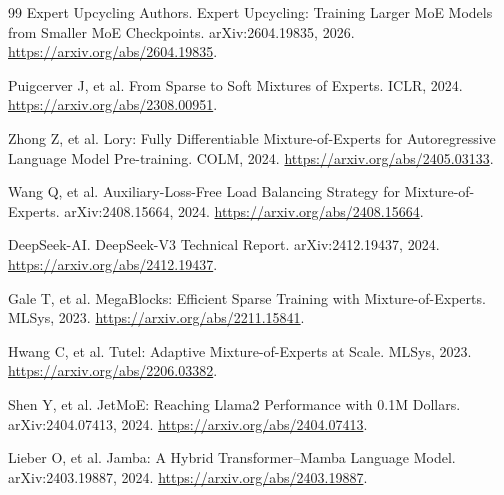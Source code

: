 \documentclass[10pt,a4paper,fontset=none]{ctexart}
\renewcommand{\abstractname}{Abstract}
\renewcommand{\contentsname}{Contents}
\renewcommand{\figurename}{Figure}
\renewcommand{\tablename}{Table}
\renewcommand{\refname}{References}
\renewcommand{\appendixname}{Appendix}
\def\BilingualTocExtension{entoc}
\newcommand{\BilingualUseChineseToc}{\gdef\BilingualTocExtension{zhtoc}}
\begin{document}
\begin{thebibliography}{99}
Expert Upcycling Authors. Expert Upcycling: Training Larger MoE Models from Smaller MoE Checkpoints. arXiv:2604.19835, 2026. \url{https://arxiv.org/abs/2604.19835}.

Puigcerver J, et al. From Sparse to Soft Mixtures of Experts. ICLR, 2024. \url{https://arxiv.org/abs/2308.00951}.

Zhong Z, et al. Lory: Fully Differentiable Mixture-of-Experts for Autoregressive Language Model Pre-training. COLM, 2024. \url{https://arxiv.org/abs/2405.03133}.

Wang Q, et al. Auxiliary-Loss-Free Load Balancing Strategy for Mixture-of-Experts. arXiv:2408.15664, 2024. \url{https://arxiv.org/abs/2408.15664}.

DeepSeek-AI. DeepSeek-V3 Technical Report. arXiv:2412.19437, 2024. \url{https://arxiv.org/abs/2412.19437}.

Gale T, et al. MegaBlocks: Efficient Sparse Training with Mixture-of-Experts. MLSys, 2023. \url{https://arxiv.org/abs/2211.15841}.

Hwang C, et al. Tutel: Adaptive Mixture-of-Experts at Scale. MLSys, 2023. \url{https://arxiv.org/abs/2206.03382}.

Shen Y, et al. JetMoE: Reaching Llama2 Performance with 0.1M Dollars. arXiv:2404.07413, 2024. \url{https://arxiv.org/abs/2404.07413}.

Lieber O, et al. Jamba: A Hybrid Transformer--Mamba Language Model. arXiv:2403.19887, 2024. \url{https://arxiv.org/abs/2403.19887}.

\end{thebibliography}
\clearpage
{}
\setcounter{section}{0}
\setcounter{subsection}{0}
\setcounter{subsubsection}{0}
\setcounter{equation}{0}
\setcounter{figure}{0}
\setcounter{table}{0}
\setcounter{footnote}{0}
\setcounter{tocdepth}{2}
\renewcommand{\abstractname}{摘要}
\renewcommand{\contentsname}{目录}
\renewcommand{\figurename}{图}
\renewcommand{\tablename}{表}
\renewcommand{\refname}{参考文献}
\renewcommand{\appendixname}{附录}
\BilingualUseChineseToc
\renewcommand*{\theHsection}{zh.\arabic{section}}
\renewcommand*{\theHsubsection}{zh.\arabic{section}.\arabic{subsection}}
\renewcommand*{\theHsubsubsection}{zh.\arabic{section}.\arabic{subsection}.\arabic{subsubsection}}
\end{document}
